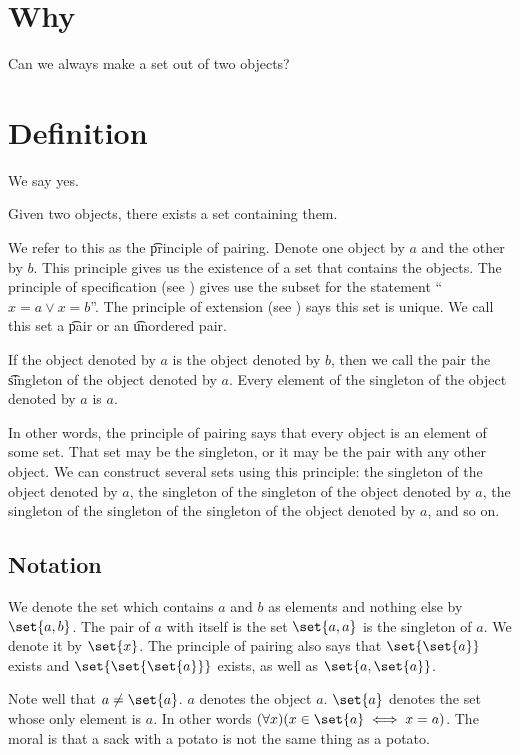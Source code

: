

\section*{Why}

Can we always make a set out of two objects?

\section*{Definition}

We say yes.
\begin{principle}[Pairing]
Given two objects, there exists a set containing them.
\end{principle}

We refer to this as the \t{principle of pairing}.
Denote one object by $a$ and the other by $b$.
This principle gives us the existence of a set that contains the objects.
The principle of specification (see ) gives use the subset for the statement ``$x = a \lor x = b$''.
The principle of extension (see ) says this set is unique.
We call this set a \t{pair} or an \t{unordered pair}.

If the object denoted by $a$ is the object denoted by $b$, then we call the pair the \t{singleton} of the object denoted by $a$.
Every element of the singleton of the object denoted by $a$ is $a$.

In other words, the principle of pairing says that every object is an element of some set.
That set may be the singleton, or it may be the pair with any other object.
We can construct several sets using this principle: the singleton of the object denoted by $a$, the singleton of the singleton of the object denoted by $a$, the singleton of the singleton of the singleton of the object denoted by $a$, and so on.

\subsection*{Notation}

We denote the set which contains $a$ and $b$ as elements and nothing else by $\set{a, b}$.
The pair of $a$ with itself is the set $\set{a, a}$ is the singleton of $a$.
We denote it by $\set{x}$.
The principle of pairing also says that $\set{\set{a}}$ exists and $\set{\set{\set{a}}}$ exists, as well as $\set{a, \set{a}}$.

Note well that $a \neq \set{a}$.
$a$ denotes the object $a$.
$\set{a}$ denotes the set whose only element is $a$.
In other words $(\forall x)(x \in \set{a} \iff x = a)$.
The moral is that a sack with a potato is not the same thing as a potato.
